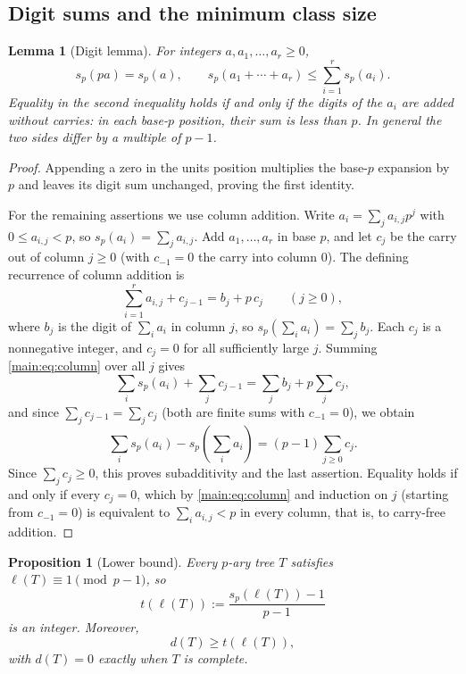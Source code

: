 \documentclass[11pt]{article}
\newtheorem{lemma}[theorem]{Lemma}
\newtheorem{proposition}[theorem]{Proposition}
\theoremstyle{definition}
\theoremstyle{remark}
\numberwithin{equation}{section}
\numberwithin{figure}{section}
\begin{document}
\subsection{Digit sums and the minimum class size}
\begin{lemma}[Digit lemma]\label{main:lem:digit}
For integers $a,a_1,\ldots,a_r\ge0$,
\[
 s_p(pa)=s_p(a),\qquad s_p(a_1+\cdots+a_r)\le\sum_{i=1}^rs_p(a_i).
\]
Equality in the second inequality holds if and only if the digits of the $a_i$ are added without carries: in each base-$p$ position, their sum is less than $p$.  In general the two sides differ by a multiple of $p-1$.
\end{lemma}
\begin{proof}
Appending a zero in the units position multiplies the base-$p$ expansion by $p$ and leaves its digit sum unchanged, proving the first identity.

For the remaining assertions we use column addition.  Write $a_i=\sum_j a_{i,j}p^j$ with $0\le a_{i,j}<p$, so $s_p(a_i)=\sum_j a_{i,j}$.  Add $a_1,\ldots,a_r$ in base $p$, and let $c_j$ be the carry out of column $j\ge0$ (with $c_{-1}=0$ the carry into column $0$).  The defining recurrence of column addition is
\begin{equation}\label{main:eq:column}
 \sum_{i=1}^r a_{i,j}+c_{j-1}=b_j+p\,c_j\qquad(j\ge0),
\end{equation}
where $b_j$ is the digit of $\sum_i a_i$ in column $j$, so $s_p(\sum_i a_i)=\sum_j b_j$.  Each $c_j$ is a nonnegative integer, and $c_j=0$ for all sufficiently large $j$.  Summing \eqref{main:eq:column} over all $j$ gives
\[
 \sum_i s_p(a_i)+\sum_j c_{j-1}=\sum_j b_j+p\sum_j c_j,
\]
and since $\sum_j c_{j-1}=\sum_j c_j$ (both are finite sums with $c_{-1}=0$), we obtain
\begin{equation}\label{main:eq:merges}
 \sum_i s_p(a_i)-s_p\!\left(\sum_i a_i\right)=(p-1)\sum_{j\ge0}c_j.
\end{equation}
Since $\sum_j c_j\ge0$, this proves subadditivity and the last assertion.  Equality holds if and only if every $c_j=0$, which by \eqref{main:eq:column} and induction on $j$ (starting from $c_{-1}=0$) is equivalent to $\sum_i a_{i,j}<p$ in every column, that is, to carry-free addition.
\end{proof}
\begin{proposition}[Lower bound]\label{main:prop:lower-bound}
Every $p$-ary tree $T$ satisfies $\ell(T)\equiv1\pmod{p-1}$, so
\[
 t(\ell(T)):=\frac{s_p(\ell(T))-1}{p-1}
\]
is an integer.  Moreover,
\[
 d(T)\ge t(\ell(T)),
\]
with $d(T)=0$ exactly when $T$ is complete.
\end{proposition}
\end{document}
